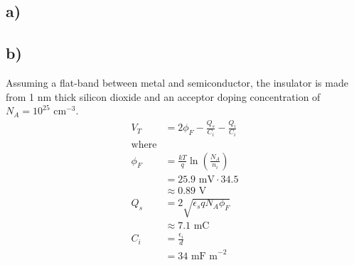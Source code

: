 \subsection*{a)}
\subsection*{b)}
Assuming a flat-band between metal and semiconductor, the insulator is made from 1 nm thick silicon dioxide and an acceptor doping concentration of $N_A = 10^{25} \textrm{ cm}^{-3}$.
\[
\begin{aligned}
	V_T &= 2 \phi_F - \frac{Q_s}{C_i} - \frac{Q_i}{C_i} \\
	\textrm{where}\\
	\phi_F	&= \frac{k T}{q} \ln \left(\frac{N_A}{n_i}\right) \\
		&= 25.9 \textrm{ mV} \cdot 34.5 \\
		&\approx 0.89 \textrm{ V} \\
	Q_s &= 2\sqrt{\epsilon_s q N_A \phi_F} \\
		&\approx 7.1 \textrm{ mC}\\
	C_i &= \frac{\epsilon_i}{d} \\
		&= 34 \textrm{ mF m}^{-2}
\end{aligned}
\]